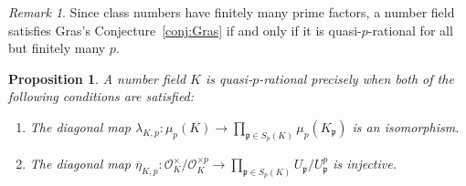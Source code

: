 \documentclass[12pt, a4paper, usenames]{amsart}
\theoremstyle{plain}
\newtheorem{prop}[theorem]{Proposition}
\theoremstyle{remark}
\newtheorem{remark}[theorem]{Remark}
\theoremstyle{definition}
\begin{document}
\begin{remark}\label{rmk:quasi-p-rat-Gras-conj}
Since class numbers have finitely many prime factors, a number field satisfies Gras's
Conjecture~\ref{conj:Gras} if and only if it is quasi-$p$-rational 
for all but finitely many $p$.
\end{remark}

\begin{prop}\label{prop:quasi-p-rat-criteria}
A number field $K$ is quasi-$p$-rational precisely 
when both of the following conditions are satisfied:
\begin{enumerate}
    \item The diagonal map $\lambda_{K,p} : \mu_{p}(K) \longrightarrow \prod_{\mathfrak{p} \in S_{p}(K)} 
    \mu_{p}(K_{\mathfrak{p}})$ is an isomorphism.
    \item The diagonal map 
    $\overline{\eta}_{K,p} \colon \mathcal{O}_{K}^{\times}/\mathcal{O}_{K}^{\times p} \longrightarrow 
    \prod_{\mathfrak{p} \in S_{p}(K)} U_{\mathfrak{p}}/ U_{\mathfrak{p}}^{p}$ is injective.
\end{enumerate}
\end{prop}
\end{document}

